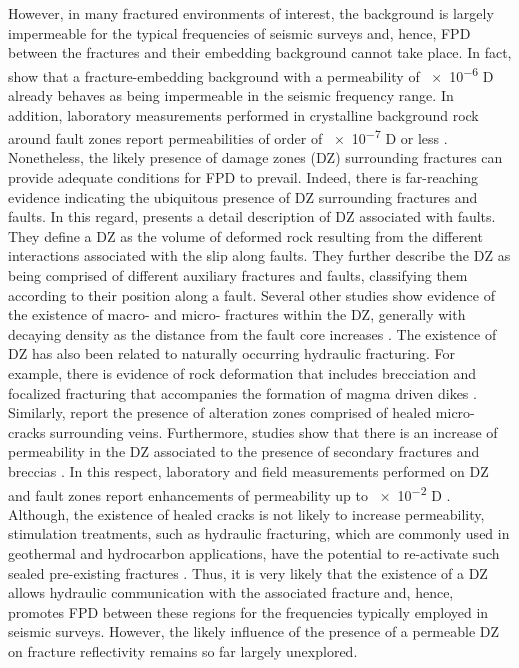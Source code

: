 \documentclass[draft]{agujournal2019}
\begin{document}
However, in many fractured environments of interest, the background is largely impermeable
for the typical frequencies of seismic surveys \cite{Rubino2014} 
and, hence, FPD  between the fractures and their embedding background cannot take place. In fact,  show that a fracture-embedding background with a permeability of  \num{e-6} D already behaves as being impermeable in the seismic frequency range. In addition,  laboratory measurements performed in crystalline background rock around fault zones report permeabilities of order of \num{e-7} D or less \cite{Wibberley2003, Mitchell2012}.
Nonetheless, the likely presence of damage zones (DZ) surrounding fractures can provide adequate conditions for FPD to prevail.
Indeed, there is far-reaching evidence indicating the ubiquitous presence of DZ surrounding fractures and faults.
In this regard,  presents a detail description of DZ associated with faults. They define a DZ as the volume of deformed rock resulting from the different interactions associated with the slip along faults. They further describe the DZ as being comprised of different auxiliary fractures and faults, classifying them according to their position along a fault. Several other studies show evidence of the existence of macro- and micro- fractures within the DZ, generally with decaying density as the distance from the fault core increases \cite{Mitchell2009,Faulkner2011, Savage2011}.
The existence of  DZ has also been related to naturally occurring hydraulic fracturing. For example, there is evidence of rock deformation that includes brecciation and focalized fracturing that accompanies the formation of magma driven dikes \cite{Delaney1981, Brown2007}. Similarly,  report the presence of alteration zones comprised of healed micro-cracks surrounding veins.
Furthermore, studies show that there is an increase of permeability in the DZ  associated to the presence of secondary fractures  \cite{Mitchell2012} and breccias \cite{Sruoga2004, Sruoga2007}. 
In this respect, laboratory and field measurements performed on DZ and fault zones report enhancements of permeability up to \num{e-2} D \cite{Brace1984,Wibberley2003}.
Although, the existence of healed cracks is not likely to increase permeability, stimulation treatments, such as hydraulic fracturing, which are commonly used in geothermal and hydrocarbon applications, have the potential to re-activate such sealed pre-existing fractures \cite{gale2010natural, dahi2013natural}.
Thus, it is very likely that the existence of a DZ  allows hydraulic communication with the associated fracture and, hence, promotes FPD between these regions for the frequencies typically employed in seismic surveys. However, the likely influence of the presence of a permeable DZ on fracture reflectivity remains so far largely unexplored. 
\end{document}
